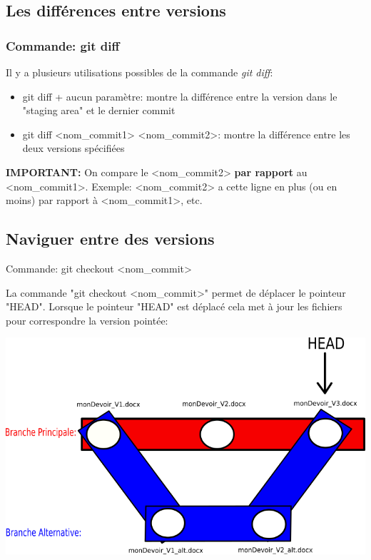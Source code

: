 \documentclass{beamer}
\begin{document}
\subsection{Les différences entre versions}
\begin{frame}
\frametitle{Commande: git diff}
Il y a plusieurs utilisations possibles de la commande \textit{git diff}:
\smallskip
\begin{itemize}
    \item git diff + aucun paramètre: montre la différence entre la version dans le "staging area" et le dernier commit
    \item git diff <nom\_commit1> <nom\_commit2>: montre la différence entre les deux versions spécifiées
\end{itemize}
\medskip

\textbf{IMPORTANT:} On compare le <nom\_commit2> \textbf{par rapport} au <nom\_commit1>. Exemple: <nom\_commit2> a cette ligne en plus (ou en moins) par rapport à <nom\_commit1>, etc.
\end{frame}


\subsection{Naviguer entre des versions}
\begin{frame}{Commande: git checkout <nom\_commit>}

La commande "git checkout <nom\_commit>" permet de déplacer le pointeur "HEAD". Lorsque le pointeur "HEAD" est déplacé cela met à jour les fichiers pour correspondre la version pointée:
\begin{center}
    \includegraphics[scale=0.45]{images/consulter_versions/secondScenario_branches.png}
\end{center}
\end{frame}
\end{document}

